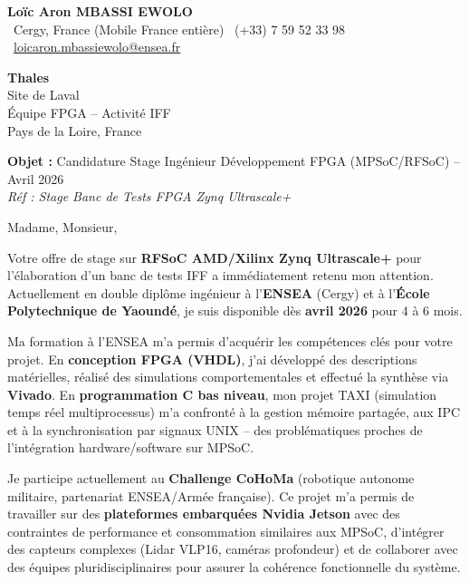 \documentclass[a4paper,11pt]{article}
\begin{document}
\begin{center}
    {\Large \textbf{Loïc Aron MBASSI EWOLO}}\\[4pt]
    \small
    \faMapMarker\ Cergy, France (Mobile France entière) \quad
    \faPhone\ (+33) 7 59 52 33 98 \quad
    \faEnvelope\ \href{mailto:loicaron.mbassiewolo@ensea.fr}{loicaron.mbassiewolo@ensea.fr}
\end{center}
\vspace{0.5cm}

\hfill
\begin{minipage}[t]{0.45\textwidth}
    \textbf{Thales}\\
    Site de Laval\\
    Équipe FPGA -- Activité IFF\\
    Pays de la Loire, France
\end{minipage}

\vspace{0.8cm}

\textbf{Objet :} Candidature Stage Ingénieur Développement FPGA (MPSoC/RFSoC) -- Avril 2026\\
\textit{Réf : Stage Banc de Tests FPGA Zynq Ultrascale+}

\vspace{0.5cm}

Madame, Monsieur,

Votre offre de stage sur \textbf{RFSoC AMD/Xilinx Zynq Ultrascale+} pour l'élaboration d'un banc de tests IFF a immédiatement retenu mon attention. Actuellement en double diplôme ingénieur à l'\textbf{ENSEA} (Cergy) et à l'\textbf{École Polytechnique de Yaoundé}, je suis disponible dès \textbf{avril 2026} pour 4 à 6 mois.

Ma formation à l'ENSEA m'a permis d'acquérir les compétences clés pour votre projet. En \textbf{conception FPGA (VHDL)}, j'ai développé des descriptions matérielles, réalisé des simulations comportementales et effectué la synthèse via \textbf{Vivado}. En \textbf{programmation C bas niveau}, mon projet TAXI (simulation temps réel multiprocessus) m'a confronté à la gestion mémoire partagée, aux IPC et à la synchronisation par signaux UNIX -- des problématiques proches de l'intégration hardware/software sur MPSoC.

Je participe actuellement au \textbf{Challenge CoHoMa} (robotique autonome militaire, partenariat ENSEA/Armée française). Ce projet m'a permis de travailler sur des \textbf{plateformes embarquées Nvidia Jetson} avec des contraintes de performance et consommation similaires aux MPSoC, d'intégrer des capteurs complexes (Lidar VLP16, caméras profondeur) et de collaborer avec des équipes pluridisciplinaires pour assurer la cohérence fonctionnelle du système.
\end{document}
